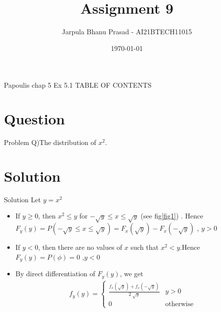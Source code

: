 \documentclass{beamer}
\title{Assignment 9}
\author{Jarpula Bhanu Prasad - AI21BTECH11015}
\date{\today}
\begin{document}
\begin{frame}
    \titlepage 
\end{frame}

\logo{}


\begin{frame}{Papoulis chap 5 Ex 5.1}
TABLE OF CONTENTS
    \tableofcontents
\end{frame}


\section{Question}
\begin{frame}{Problem}
Q)The distribution of $x^2$. 
\end{frame}

\section{Solution}
\begin{frame}{Solution}
    Let $y = x^2$ \\
    \begin{itemize}
        \item If $ y \ge 0 $, then $x^2 \le y$ for $-\sqrt{y} \le x \le \sqrt{y}$ (see fig\eqref{fig1}) .
        Hence \\ $F_y(y)=P(-\sqrt{y} \le x \le \sqrt{y})=F_x(\sqrt{y})-F_x({-}\sqrt{y})$  , $y>0$ \\ 
        
        \item  If $y<0$, then there are no values of $x$ such that $x^2 < y $.Hence \\
        $F_y(y)=P(\phi)=0$ ,$y<0$ \\

        \item By direct differentiation of $F_y(y)$, we get \\
        \begin{align}
            f_y(y) = 
            \begin{cases}
            \frac{f_x(\sqrt{y})+f_x({-}\sqrt{y})}{2 \sqrt[]{y}} & y>0 \\
            0 & \text{otherwise} 
            \end{cases}
            \label{1}
            \end{align}
        
    \end{itemize}

\end{frame}
\end{document}
